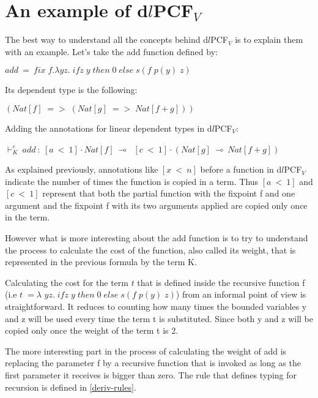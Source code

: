\documentclass[a4paper,12pt]{article}
\begin{document}
\section{An example of d$l$PCF$_{V}$}

The best way to understand all the concepts behind d$l$PCF$_{V}$ is to
explain them with an example. Let's take the add function defined by:

\begin{center}
$add~=~fix\;f.\lambda yz.\;ifz\;y\;then\;0\;else\;s(f\;p(y)\;z)$
\end{center}

Its dependent type is the following:

\begin{center}
$(Nat[f]\; =>\;(Nat[g]\; =>\;Nat[f + g]))$
\end{center}

Adding the annotations for linear dependent types in d$l$PCF$_{V}$:

\begin{center}
$\vdash^{\varepsilon}_{K}~add~:~[a~<~1] \cdot Nat[f]~\multimap~$
  $[c~<~1] \cdot (Nat[g]~\multimap~Nat[f + g])$
\end{center}

As explained previously, annotations like $[x~<~n]$ before a function
in d$l$PCF$_{V}$  indicate the number of times the function is copied in a term. Thus
$[a~<~1]$ and $[c~<~1]$ represent that both the partial function with
the fixpoint f and one argument and the fixpoint f with its two
arguments applied are copied only once in the term.

However what is more interesting about the add function is to try to
understand the process to calculate the cost of the function, also
called its weight, that is represented in the previous formula by the
term K. 

Calculating the cost for the term $t$ that is defined inside the
recursive function f (i.e $t\;=\lambda$
$yz.\;ifz\;y\;then\;0\;else\;s(f\;p(y)\;z)$) from an informal point of
view is straightforward. It reduces to counting how many times the
bounded variables y and z will be used every time the term t is
substituted. Since both y and z will be copied only once the weight of the
term t is 2.

The more interesting part in the process of calculating the weight of
add is replacing the parameter f by a recursive function that is
invoked as long as the first parameter it receives is bigger than
zero. The rule that defines typing for recursion is defined in \ref{deriv-rules}.
\end{document}
